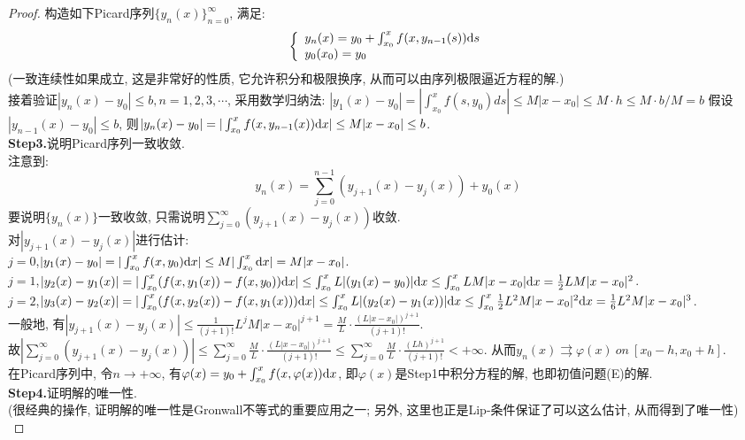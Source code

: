 \begin{proof}
    构造如下Picard序列$\{y_n(x)\}_{n=0}^{\infty}$, 满足:
    $$ \left\{
    \begin{array}{ll}
    y_n(x)=y_0+\int_{x_0}^{x}f(x,y_{n-1}(s)){\rm d}s \\
    y_0(x_0) =  y_0
    \end{array}
    \right.
    $$
    (一致连续性如果成立, 这是非常好的性质, 它允许积分和极限换序, 从而可以由序列极限逼近方程的解.)\\
    接着验证$|y_n(x)-y_0|\leq b,n=1,2,3,\cdots$, 采用数学归纳法:
    $|y_1(x)-y_0|=|\int_{x_0}^xf(s,y_0)ds|\leq M|x-x_0|\leq M\cdot h\leq M\cdot b/M=b$
    假设$|y_{n-1}(x)-y_0|\leq b$, 则$|y_{n}(x)-y_0|=|\int_{x_0}^{x}f(x,y_{n-1}(x)){\rm d}x|\leq M|x-x_0|\leq b$.
    \\ \textbf{Step3.}说明Picard序列一致收敛.\\
    注意到: 
    $$y_n(x)=\sum_{j=0}^{n-1}(y_{j+1}(x)-y_{j}(x))+y_0(x)$$
    要说明$\{y_n(x)\}$一致收敛, 只需说明$\sum_{j=0}^{\infty}(y_{j+1}(x)-y_{j}(x))$收敛.\\
    对$|y_{j+1}(x)-y_j(x)|$进行估计:\\
    $j=0$,$|y_{1}(x)-y_0|=|\int_{x_0}^{x}f(x,y_0){\rm d}x|\leq M|\int_{x_0}^x {\rm d}x|=M|x-x_0|$.\\
    $j=1$,$|y_{2}(x)-y_1(x)|=|\int_{x_0}^{x}(f(x,y_1(x))-f(x,y_0)){\rm d}x|\leq \int_{x_0}^{x}L|(y_1(x)-y_0)|{\rm d}x\leq\int_{x_0}^{x}LM|x-x_0|{\rm d}x=\frac{1}{2}LM|x-x_0|^2$.\\
    $j=2$,$|y_{3}(x)-y_{2}(x)|=|\int_{x_0}^{x}(f(x,y_2(x))-f(x,y_1(x))){\rm d}x|\leq \int_{x_0}^{x}L|(y_2(x)-y_1(x))|{\rm d}x\leq\int_{x_0}^{x}\frac{1}{2}L^2M|x-x_0|^2{\rm d}x=\frac{1}{6}L^2M|x-x_0|^3$.\\
    一般地, 有$|y_{j+1}(x)-y_j(x)|\leq \frac{1}{(j+1)!}L^jM|x-x_0|^{j+1}=\frac{M}{L}\cdot\frac{(L|x-x_0|)^{j+1}}{(j+1)!}$.\\
    故$|\sum_{j=0}^{\infty}(y_{j+1}(x)-y_{j}(x))|\leq\sum_{j=0}^{\infty}\frac{M}{L}\cdot\frac{(L|x-x_0|)^{j+1}}{(j+1)!}\leq\sum_{j=0}^{\infty}\frac{M}{L}\cdot\frac{(Lh)^{j+1}}{(j+1)!}<+\infty$.
    从而$y_n(x)\rightrightarrows \varphi(x)\ on \ [x_0-h,x_0+h]$.\\
    在Picard序列中, 令$n\to+\infty$, 有$\varphi(x)=y_0+\int_{x_0}^{x}f(x,\varphi(x)){\rm d}x$, 即$\varphi(x)$是Step1中积分方程的解, 也即初值问题(E)的解.
    \\ \textbf{Step4.}证明解的唯一性.\\
    (很经典的操作, 证明解的唯一性是Gronwall不等式的重要应用之一; 另外, 这里也正是Lip-条件保证了可以这么估计, 从而得到了唯一性)\\

\end{proof}
